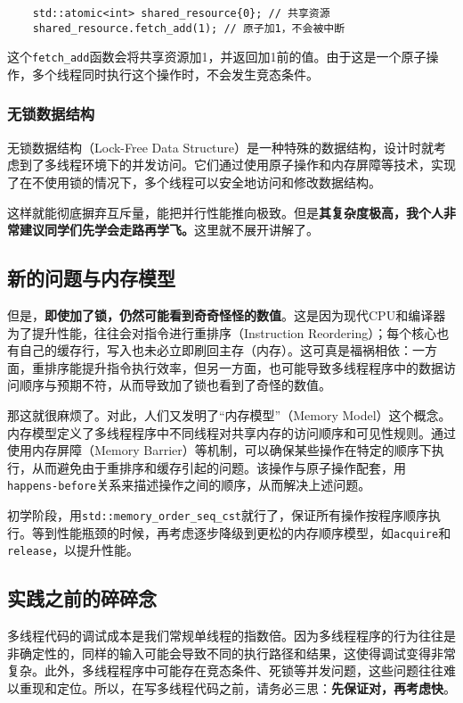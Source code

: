 \begin{lstlisting}
    std::atomic<int> shared_resource{0}; // 共享资源
    shared_resource.fetch_add(1); // 原子加1，不会被中断
\end{lstlisting}
这个\texttt{fetch\_add}函数会将共享资源加1，并返回加1前的值。由于这是一个原子操作，多个线程同时执行这个操作时，不会发生竞态条件。

\subsubsection{无锁数据结构}

无锁数据结构（Lock-Free Data Structure）是一种特殊的数据结构，设计时就考虑到了多线程环境下的并发访问。它们通过使用原子操作和内存屏障等技术，实现了在不使用锁的情况下，多个线程可以安全地访问和修改数据结构。

这样就能彻底摒弃互斥量，能把并行性能推向极致。但是\textbf{其复杂度极高，我个人非常建议同学们先学会走路再学飞。}这里就不展开讲解了。

\subsection{新的问题与内存模型}

但是，\textbf{即使加了锁，仍然可能看到奇奇怪怪的数值}。这是因为现代CPU和编译器为了提升性能，往往会对指令进行重排序（Instruction Reordering）；每个核心也有自己的缓存行，写入也未必立即刷回主存（内存）。这可真是福祸相依：一方面，重排序能提升指令执行效率，但另一方面，也可能导致多线程程序中的数据访问顺序与预期不符，从而导致加了锁也看到了奇怪的数值。

那这就很麻烦了。对此，人们又发明了“内存模型”（Memory Model）这个概念。内存模型定义了多线程程序中不同线程对共享内存的访问顺序和可见性规则。通过使用内存屏障（Memory Barrier）等机制，可以确保某些操作在特定的顺序下执行，从而避免由于重排序和缓存引起的问题。该操作与原子操作配套，用\texttt{happens-before}关系来描述操作之间的顺序，从而解决上述问题。

初学阶段，用\texttt{std::memory\_order\_seq\_cst}就行了，保证所有操作按程序顺序执行。等到性能瓶颈的时候，再考虑逐步降级到更松的内存顺序模型，如\texttt{acquire}和\texttt{release}，以提升性能。

\subsection{实践之前的碎碎念}

多线程代码的调试成本是我们常规单线程的指数倍。因为多线程程序的行为往往是非确定性的，同样的输入可能会导致不同的执行路径和结果，这使得调试变得非常复杂。此外，多线程程序中可能存在竞态条件、死锁等并发问题，这些问题往往难以重现和定位。所以，在写多线程代码之前，请务必三思：\textbf{先保证对，再考虑快}。

